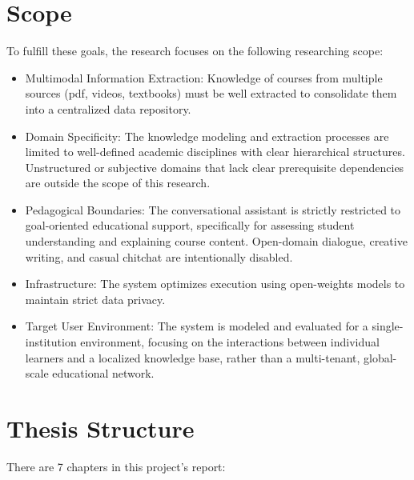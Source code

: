 \section{Scope}

To fulfill these goals, the research focuses on the following researching scope:
\begin{itemize}
    \item {Multimodal Information Extraction:} Knowledge of courses from multiple sources (pdf, videos, textbooks) must be well extracted 
    to consolidate them into a centralized data repository.
    \item {Domain Specificity:} The knowledge modeling and extraction processes are limited to well-defined academic disciplines with clear hierarchical structures. Unstructured or subjective domains that lack clear prerequisite dependencies are outside the scope of this research.
    \item {Pedagogical Boundaries:} The conversational assistant is strictly restricted to goal-oriented educational support, specifically for assessing 
    student understanding and explaining course content. Open-domain dialogue, creative writing, and casual chitchat are intentionally disabled.
    \item {Infrastructure:} The system optimizes execution using open-weights models to maintain strict data privacy. 
    \item {Target User Environment:} The system is modeled and evaluated for a single-institution environment, focusing on the interactions between individual learners and a localized knowledge base, rather than a multi-tenant, global-scale educational network.
\end{itemize}

\section{Thesis Structure}
There are 7 chapters in this project's report:

